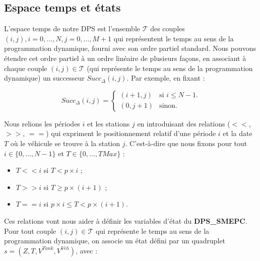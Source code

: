 \subsection{ Espace temps et états}
L'espace temps de notre DPS est l'ensemble $\mathcal{T}$ des couples $(i, j), i = 0, \dots, N, j = 0, \dots, M + 1$ qui représentent le temps au sens de la programmation dynamique, fourni avec son ordre partiel standard. Nous pouvons étendre cet ordre partiel à un ordre linéaire de plusieurs façons, en associant à chaque couple $(i, j) \in \mathcal{T} $ (qui représente le temps au sens de la programmation dynamique) un successeur $Succ_{\Delta}(i,j)$. Par exemple, en fixant :

$$
Succ_{\Delta}(i,j)= \left\{
\begin{array}{ll}
(i+1,j) & \mbox{si  $i \leq N-1$.} \\
(0,j+1) & \mbox{sinon.}
\end{array}
\right.
$$

Nous relions les périodes $i$ et les stations $j$ en introduisant des relations ($<<$, $>>$, $==$) qui expriment le positionnement relatif d'une période $i$ et la date $T$ où le véhicule se trouve à la station $j$. C'est-à-dire que nous fixons pour tout $i \in \{0, \dots, N-1\}$ et $T \in \{0, \dots, TMax\}$ :
\begin{itemize}[label=$\square$]
	\item $T<<i$ si $T < p \times i$ ;
	\item $T>>i$ si $T\geq p \times (i+1)$ ;
	\item $T==i$ si $p \times i \leq T < p \times (i+1)$.
\end{itemize}

Ces relations vont nous aider à définir les variables d'état du \textbf{DPS\_SMEPC}. Pour tout couple $(i, j) \in \mathcal{T}$ qui représente le temps au sens de la programmation dynamique, on associe un état défini par un quadruplet $s = (Z, T, V^{Tank}, V^{Veh})$, avec :


